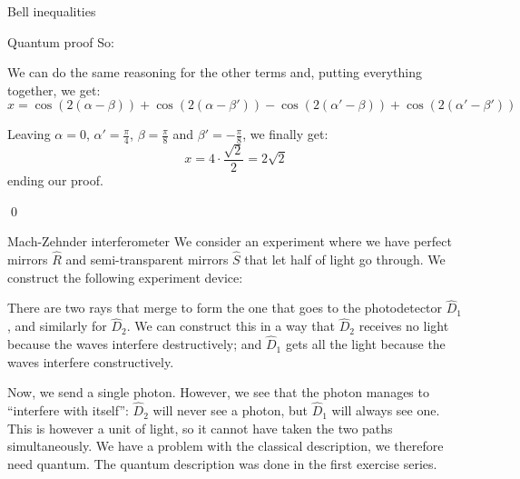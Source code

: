 \documentclass[a4paper]{article}
\begin{document}
\begin{parag}{Bell inequalities}
\begin{subparag}{Quantum proof}
        So: 
        
        We can do the same reasoning for the other terms and, putting everything together, we get: 
        \[x = \cos\left(2\left(\alpha - \beta\right)\right) + \cos\left(2\left(\alpha - \beta'\right)\right) - \cos\left(2\left(\alpha' - \beta\right)\right) + \cos\left(2\left(\alpha' - \beta'\right)\right)\]
        
        Leaving $\alpha = 0$, $\alpha' = \frac{\pi}{4}$, $\beta = \frac{\pi}{8}$ and $\beta' = -\frac{\pi}{8}$, we finally get: 
        \[x = 4\cdot \frac{\sqrt{2}}{2} = 2\sqrt{2}\]
        ending our proof.

        \qed
    \end{subparag}
\end{parag}

\begin{parag}{Mach-Zehnder interferometer}
    We consider an experiment where we have perfect mirrors $\hat{R}$ and semi-transparent mirrors $\hat{S}$ that let half of light go through. We construct the following experiment device:

    There are two rays that merge to form the one that goes to the photodetector $\hat{D}_1$, and similarly for $\hat{D}_2$. We can construct this in a way that $\hat{D}_2$ receives no light because the waves interfere destructively; and $\hat{D}_1$ gets all the light because the waves interfere constructively.

    Now, we send a single photon. However, we see that the photon manages to ``interfere with itself'': $\hat{D}_2$ will never see a photon, but $\hat{D}_1$ will always see one.  This is however a unit of light, so it cannot have taken the two paths simultaneously. We have a problem with the classical description, we therefore need quantum. The quantum description was done in the first exercise series.
\end{parag}
\end{document}
